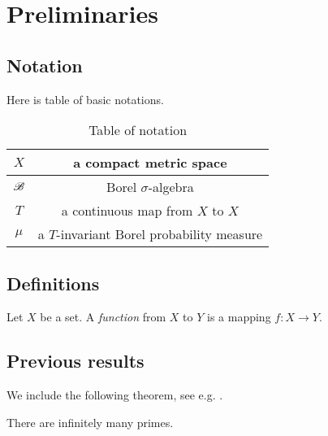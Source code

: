 
\chapter{Preliminaries} \label{chp:preliminaries}

\section{Notation}

Here is table of basic notations.

\begin{table}[H]
	\centering
	\begin{tabular}{c|c}
		\hline
		$ X $ & a compact metric space \\
		\hline
		$ \mathscr{B} $ & Borel $ \sigma $\nobreakdash-algebra\\
		\hline
		$ T $ & a continuous map from $ X $ to $ X $ \\
		\hline
		$ \mu $ & a $ T $\nobreakdash-invariant Borel probability measure \\
		\hline
 	\end{tabular}
	\caption{Table of notation}
\end{table}


\section{Definitions}
\begin{definition}
	Let $X$ be a set. A \emph{function} from $X$ to $Y$ is a mapping $f \colon X \to Y$.
\end{definition}

\section{Previous results}

We include the following theorem, see e.g. \cite{HardyWright2008}.
\begin{theorem}
	There are infinitely many primes.
\end{theorem}